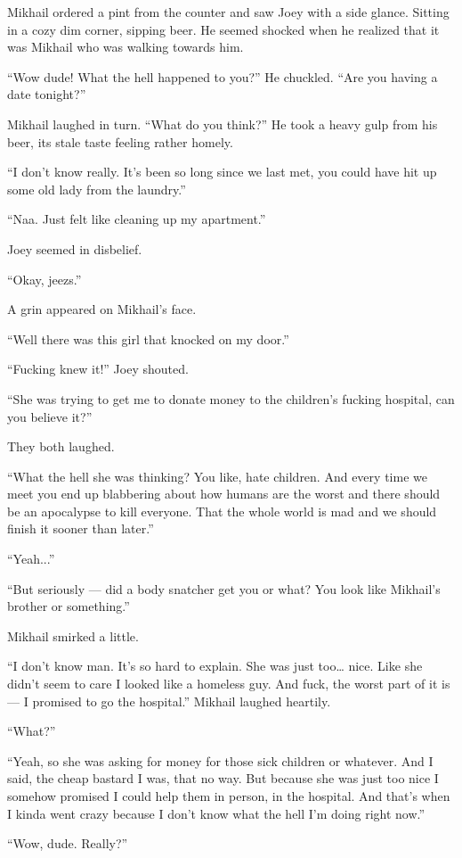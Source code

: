 Mikhail ordered a pint from the counter and saw Joey with a side glance. Sitting in a cozy dim corner, sipping beer. He seemed shocked when he realized that it was Mikhail who was walking towards him.

“Wow dude! What the hell happened to you?” He chuckled. “Are you having a date tonight?” 

Mikhail laughed in turn. “What do you think?” He took a heavy gulp from his beer, its stale taste feeling rather homely.

“I don’t know really. It’s been so long since we last met, you could have hit up some old lady from the laundry.”

“Naa. Just felt like cleaning up my apartment.”

Joey seemed in disbelief.

“Okay, jeezs.”

A grin appeared on Mikhail’s face.

“Well there was this girl that knocked on my door.”

“Fucking knew it!” Joey shouted.

“She was trying to get me to donate money to the children’s fucking hospital, can you believe it?”

They both laughed.

“What the hell she was thinking? You like, hate children. And every time we meet you end up blabbering about how humans are the worst and there should be an apocalypse to kill everyone. That the whole world is mad and we should finish it sooner than later.”

“Yeah...”

“But seriously — did a body snatcher get you or what? You look like Mikhail’s brother or something.”

Mikhail smirked a little.

“I don’t know man. It’s so hard to explain. She was just too… nice. Like she didn’t seem to care I looked like a homeless guy. And fuck, the worst part of it is — I promised to go the hospital.” Mikhail laughed heartily.

“What?”

“Yeah, so she was asking for money for those sick children or whatever. And I said, the cheap bastard I was, that no way. But because she was just too nice I somehow promised I could help them in person, in the hospital. And that’s when I kinda went crazy because I don’t know what the hell I'm doing right now.”

“Wow, dude. Really?”

